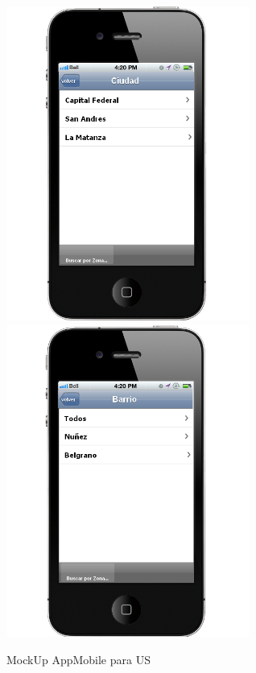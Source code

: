 \documentclass[spanish, DIV=calc, paper=a4, fontsize=11pt, twocolumn]{scrartcl}	 %
\begin{document}
\begin{figure}[htp]
\includegraphics[width=8.0cm,height=\paperheight,keepaspectratio]{img/mockUpAppMobileUS/buscar1.png}%
\includegraphics[width=8.0cm,height=\paperheight,keepaspectratio]{img/mockUpAppMobileUS/buscar2.png}%
\caption{MockUp AppMobile para US}
\label{dash-1}
\end{figure}
\end{document}
